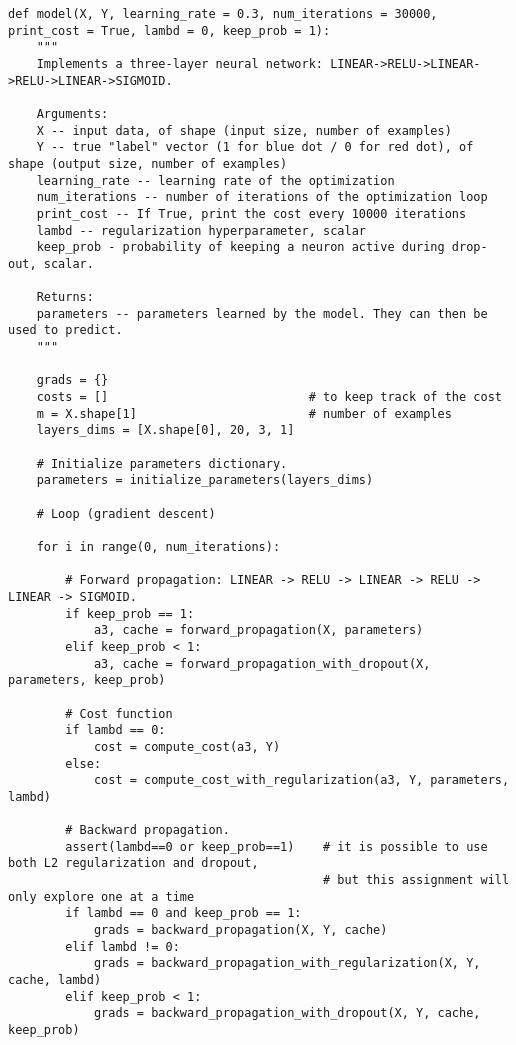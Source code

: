 \begin{verbatim}
def model(X, Y, learning_rate = 0.3, num_iterations = 30000, print_cost = True, lambd = 0, keep_prob = 1):
    """
    Implements a three-layer neural network: LINEAR->RELU->LINEAR->RELU->LINEAR->SIGMOID.
    
    Arguments:
    X -- input data, of shape (input size, number of examples)
    Y -- true "label" vector (1 for blue dot / 0 for red dot), of shape (output size, number of examples)
    learning_rate -- learning rate of the optimization
    num_iterations -- number of iterations of the optimization loop
    print_cost -- If True, print the cost every 10000 iterations
    lambd -- regularization hyperparameter, scalar
    keep_prob - probability of keeping a neuron active during drop-out, scalar.
    
    Returns:
    parameters -- parameters learned by the model. They can then be used to predict.
    """
        
    grads = {}
    costs = []                            # to keep track of the cost
    m = X.shape[1]                        # number of examples
    layers_dims = [X.shape[0], 20, 3, 1]
    
    # Initialize parameters dictionary.
    parameters = initialize_parameters(layers_dims)

    # Loop (gradient descent)

    for i in range(0, num_iterations):

        # Forward propagation: LINEAR -> RELU -> LINEAR -> RELU -> LINEAR -> SIGMOID.
        if keep_prob == 1:
            a3, cache = forward_propagation(X, parameters)
        elif keep_prob < 1:
            a3, cache = forward_propagation_with_dropout(X, parameters, keep_prob)
        
        # Cost function
        if lambd == 0:
            cost = compute_cost(a3, Y)
        else:
            cost = compute_cost_with_regularization(a3, Y, parameters, lambd)
            
        # Backward propagation.
        assert(lambd==0 or keep_prob==1)    # it is possible to use both L2 regularization and dropout, 
                                            # but this assignment will only explore one at a time
        if lambd == 0 and keep_prob == 1:
            grads = backward_propagation(X, Y, cache)
        elif lambd != 0:
            grads = backward_propagation_with_regularization(X, Y, cache, lambd)
        elif keep_prob < 1:
            grads = backward_propagation_with_dropout(X, Y, cache, keep_prob)
        

\end{verbatim}
